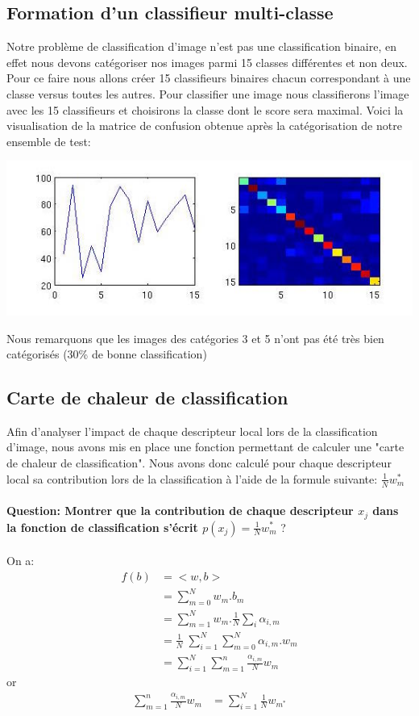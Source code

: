 \documentclass[a4paper]{article}
\begin{document}
\subsection{Formation d'un classifieur multi-classe}
Notre problème de classification d'image n'est pas une classification binaire, en effet nous devons catégoriser nos images parmi 15 classes différentes et non deux. Pour ce faire nous allons créer 15 classifieurs binaires chacun correspondant à une classe versus toutes les autres. Pour classifier une image nous classifierons l'image avec les 15 classifieurs et choisirons la classe dont le score sera maximal.
\newpage
Voici la visualisation de la matrice de confusion obtenue après la catégorisation de notre ensemble de test:\\
\begin{center}
\includegraphics[scale=0.7]{confusion}
\end{center}
Nous remarquons que les images des catégories 3 et 5 n'ont pas été très bien catégorisés (30\% de bonne classification)
\subsection{Carte de chaleur de classification}
Afin d'analyser l'impact de chaque descripteur local lors de la classification d'image, nous avons mis en place une fonction permettant de calculer une "carte de chaleur de classification".  Nous avons donc calculé pour chaque descripteur local sa contribution lors de la classification à l'aide de la formule suivante:  $\frac{1}{N}  w_m^*$ \\\\
\textbf{Question: Montrer que la contribution de chaque descripteur $x_j$ dans la fonction de classification s'écrit $p(x_j) = \frac{1}{N}  w_m^*$} ?\\\\
On a:\\
\begin{align*}
\nonumber {}f\left ( b \right )&= <w,b > \\
\nonumber {}&= \sum_{m=0}^{N}w_m.b_m\\
\nonumber {}&=\sum_{m=1}^{N}w_m.\frac{1}{N}\sum_{i}\alpha_{i,m}\\
\nonumber {}&=\frac{1}{N}\; \sum_{i=1}^{N}\sum_{m=0}^{N}\alpha_{i,m}.w_m\\
\nonumber {}&=\sum_{i=1}^{N}\sum_{m=1}^{n}\frac{\alpha_{i,m}}{N}w_m
\end{align*}
or \\
\begin{align*}
\sum_{m=1}^{n}\frac{\alpha_{i,m}}{N}w_m &= \sum_{i=1}^{N}\frac{1}{N}w_{m^*}
\end{align*}
\end{document}
